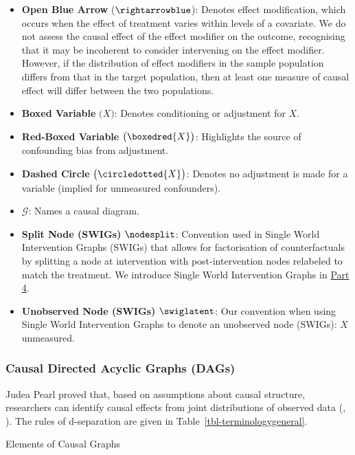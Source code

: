 \documentclass[
  single column]{article}
\begin{document}
\begin{itemize}
\item
  \textbf{Open Blue Arrow} (\(\rightarrowblue\)): Denotes effect
  modification, which occurs when the effect of treatment varies within
  levels of a covariate. We do not assess the causal effect of the
  effect modifier on the outcome, recognising that it may be incoherent
  to consider intervening on the effect modifier. However, if the
  distribution of effect modifiers in the sample population differs from
  that in the target population, then at least one measure of causal
  effect will differ between the two populations.
\item
  \textbf{Boxed Variable} \(\big(\boxed{X}\big)\): Denotes conditioning
  or adjustment for \(X\).
\item
  \textbf{Red-Boxed Variable} \(\big(\boxedred{X}\big)\): Highlights the
  source of confounding bias from adjustment.
\item
  \textbf{Dashed Circle} \(\big(\circledotted{X}\big)\): Denotes no
  adjustment is made for a variable (implied for unmeasured
  confounders).
\item
  \textbf{\(\mathcal{G}\)}: Names a causal diagram.
\item
  \textbf{Split Node (SWIGs)} \(\nodesplit\): Convention used in Single
  World Intervention Graphs (SWIGs) that allows for factorisation of
  counterfactuals by splitting a node at intervention with
  post-intervention nodes relabeled to match the treatment. We introduce
  Single World Intervention Graphs in \hyperref[id-sec-4]{Part 4}.
\item
  \textbf{Unobserved Node (SWIGs)} \(\swiglatent\): Our convention when
  using Single World Intervention Graphs to denote an unobserved node
  (SWIGs): \(X\) unmeasured.
\end{itemize}

\subsubsection{Causal Directed Acyclic Graphs
(DAGs)}\label{causal-directed-acyclic-graphs-dags}

Judea Pearl proved that, based on assumptions about causal structure,
researchers can identify causal effects from joint distributions of
observed data (,
). The rules of d-separation are given in
Table~\ref{tbl-terminologygeneral}.

\begin{table}

\caption{\label{tbl-terminologygeneral}Elements of Causal Graphs}

\centering{

\terminologydirectedgraph

}

\end{table}%
\end{document}
